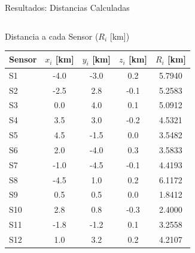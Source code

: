 

\begin{frame}{Resultados: Distancias Calculadas}

    \begin{columns}[c]

        \begin{block}{Distancia a cada Sensor ($R_i$ [km])}
            \centering
            \scriptsize 
            \begin{tabular}{@{}lcccc@{}}
                \toprule
            \textbf{Sensor} & \textbf{$x_i$ [km]} & \textbf{$y_i$ [km]} & \textbf{$z_i$ [km]} & \textbf{$R_i$ [km]} \\ \midrule
                S1  & -4.0 & -3.0 &  0.2 & 5.7940 \\
                S2  & -2.5 &  2.8 & -0.1 & 5.2583 \\
                S3  &  0.0 &  4.0 &  0.1 & 5.0912 \\
                S4  &  3.5 &  3.0 & -0.2 & 4.5321 \\
                S5  &  4.5 & -1.5 &  0.0 & 3.5482 \\
                S6  &  2.0 & -4.0 &  0.3 & 3.5833 \\
                S7  & -1.0 & -4.5 & -0.1 & 4.4193 \\
                S8  & -4.5 &  1.0 &  0.2 & 6.1172 \\
                S9  &  0.5 &  0.5 &  0.0 & 1.8412 \\
                S10 &  2.8 &  0.8 & -0.3 & 2.4000 \\
                S11 & -1.8 & -1.2 &  0.1 & 3.2558 \\
                S12 &  1.0 &  3.2 &  0.2 & 4.2107 \\ \bottomrule
            \end{tabular}
        \end{block}



\end{columns}
\end{frame}
